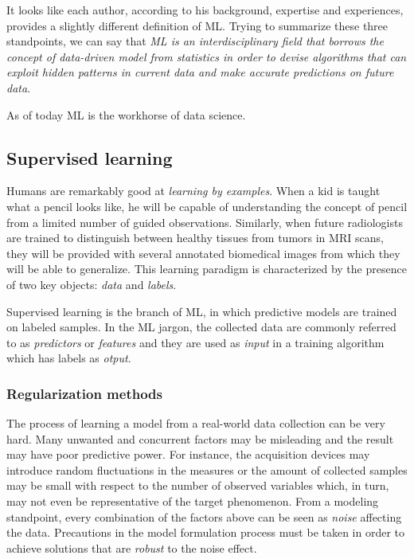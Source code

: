 It looks like each author, according to his background, expertise and experiences, provides a slightly different definition of ML. Trying to summarize these three standpoints, we can say that \emph{ML is an interdisciplinary field that borrows the concept of data-driven model from statistics in order to devise algorithms that can exploit hidden patterns in current data and make accurate predictions on future data}.

As of today ML is the workhorse of data science.


  \subsection{Supervised learning} \label{subsec:supervised_learning}

  Humans are remarkably good at \emph{learning by examples}. When a kid is taught what a pencil looks like, he will be capable of understanding the concept of pencil from a limited number of guided observations. Similarly, when future radiologists are trained to distinguish between healthy tissues from tumors in MRI scans, they will be provided with several annotated biomedical images from which they will be able to generalize.
  This learning paradigm is characterized by the presence of two key objects: \textit{data} and \textit{labels}.

  Supervised learning is the branch of ML, in which predictive models are trained on labeled samples. In the ML jargon, the collected data are commonly referred to as \textit{predictors} or \textit{features} and they are used as \textit{input} in a training algorithm which has labels as \textit{otput}.



    \subsubsection{Regularization methods}
    The process of learning a model from a real-world data collection can be very hard. Many unwanted and concurrent factors may be misleading and the result may have poor predictive power. For instance, the acquisition devices may introduce random fluctuations in the measures or the amount of collected samples may be small with respect to the number of observed variables which, in turn, may not even be representative of the target phenomenon. From a modeling standpoint, every combination of the factors above can be seen as \textit{noise} affecting the data.
    Precautions in the model formulation process must be taken in order to achieve solutions that are \textit{robust} to the noise effect.


